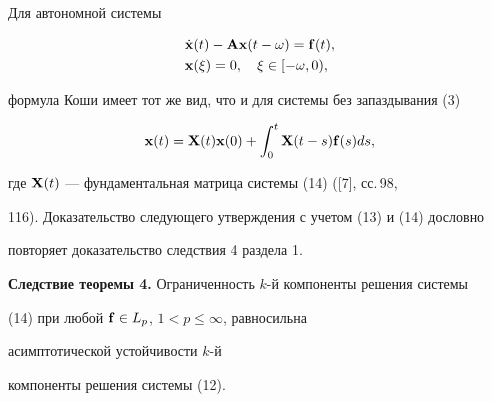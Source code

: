  


Для автономной системы 


\begin{equation} 


\begin{split} 


& \Dot {\bold x}(t)-\bold A\bold x(t-\omega)=\bold f(t),\\ 


& \bold x(\xi)=0,\quad \xi\in[-\omega,0), 


\end{split} 


\end{equation} 


формула Коши имеет тот же вид, что и для системы без запаздывания (3) 


$$ 


\bold x(t)=\bold X(t)\bold x(0)+\int^t_0\bold X(t-s)\bold f(s)ds, 


$$ 


где $\bold X(t)$ --- фундаментальная матрица системы (14) ([7], сс.\,98, 


116). Доказательство следующего утверждения с учетом (13) и (14) дословно 


повторяет доказательство следствия 4 раздела 1. 


\medskip 


 


{\bf Следствие теоремы 4.} Ограниченность $k$-й компоненты решения системы 


(14) при любой $\bold f\in L_p$, $1<p\le\infty$, равносильна 


асимптотической устойчивости $k$-й 


компоненты решения системы (12). 


 


 


